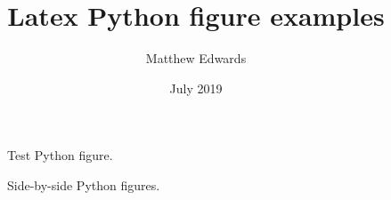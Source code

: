 \documentclass[12pt,a4paper]{article}
\begin{document}
    \title{Latex Python figure examples}
    \author{Matthew Edwards}
    \date{July 2019}
    \maketitle

    \begin{figure}[h]
        \caption{Test Python figure.}
        \label{fig:test}
    \end{figure}

    \begin{figure}
        \centering
        \caption{Side-by-side Python figures.}
        \label{fig:test2}
    \end{figure}
\end{document}
